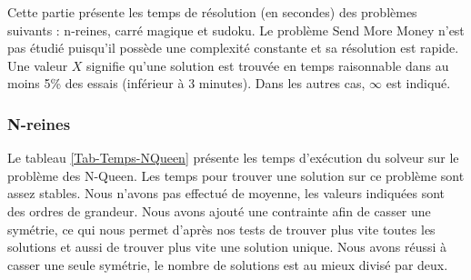 Cette partie présente les temps de résolution (en secondes) des problèmes suivants : n-reines, carré magique et sudoku. Le problème Send More Money n'est pas étudié puisqu'il possède une complexité constante et sa résolution est rapide. Une valeur $X$ signifie qu'une solution est trouvée en temps raisonnable dans au moins 5\% des essais (inférieur à 3 minutes). Dans les autres cas, $\infty$ est indiqué.

\subsubsection{N-reines}

Le tableau \ref{Tab-Temps-NQueen} présente les temps d'exécution du solveur sur le problème des N-Queen. Les temps pour trouver une solution sur ce problème sont assez stables. Nous n'avons pas effectué de moyenne, les valeurs indiquées sont des ordres de grandeur. Nous avons ajouté une contrainte afin de casser une symétrie, ce qui nous permet d'après nos tests de trouver plus vite toutes les solutions et aussi de trouver plus vite une solution unique. Nous avons réussi à casser une seule symétrie, le nombre de solutions est au mieux divisé par deux.

